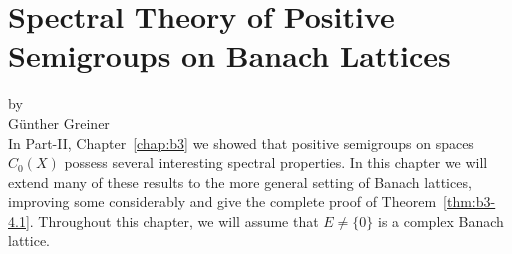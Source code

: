 \setcounter{section}{0}
\chapter[Spectral Theory on Banach Lattices]{Spectral Theory of Positive Semigroups on Banach Lattices}\label{chap:c3}
\thispagestyle{empty}
{\Large
\vspace*{-.75cm}
by \\[.25em]
Günther Greiner
\vspace{.75cm}
\\
}
In Part-II, Chapter~\ref{chap:b3} we showed that positive semigroups on spaces $C_{0}(X)$ possess several interesting spectral properties.
In this chapter we will extend many of these results to the more general setting of Banach lattices, 
improving some considerably and give the complete proof of Theorem~\ref{thm:b3-4.1}. 
Throughout this chapter, we will assume that $E \neq \{0\}$ is a complex Banach lattice.

